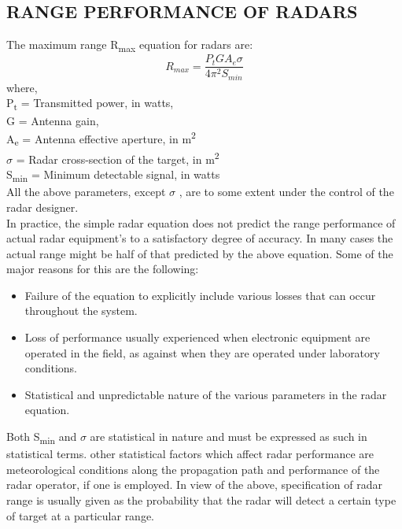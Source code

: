 \documentclass[12pt]{article} %
\begin{document}
\subsection{RANGE PERFORMANCE OF RADARS}
\noindent The maximum range R\textsubscript{max} equation for radars are:
\[R_{max} = \dfrac{P_tGA_e\sigma}{4\pi^{2}S_{min}} \]
where, \\ \indent P\textsubscript{t} = Transmitted power, in watts,
              \\ \indent G = Antenna gain,
              \\ \indent A\textsubscript{e} = Antenna effective aperture, in m\textsuperscript{2}
                         \\ \indent $\sigma$ =  Radar cross-section of the target, in m\textsuperscript{2}
              \\ \indent S\textsubscript{min} =  Minimum detectable signal, in watts\\
All the above parameters, except $\sigma$  , are to some extent under the control of the radar designer.
\\ In practice, the simple radar equation does not predict the range performance of actual radar equipment’s to a satisfactory degree of accuracy.
 In many cases the actual range might be half of that predicted by the above equation. Some of the major reasons for this are the following:
\begin{itemize} 
\item  Failure of the equation to explicitly include various losses that can occur throughout the system.
\item Loss of performance usually experienced when electronic equipment are operated in the field, as against when they are operated under laboratory conditions.
\item Statistical and unpredictable nature of the various parameters in the radar equation.
\end{itemize}
Both S\textsubscript{min} and $\sigma$ are statistical in nature and must be expressed as such in statistical terms. other statistical factors which affect radar performance are meteorological conditions along the propagation path and performance of the radar operator, if one is employed.
In view of the above, specification of radar range is usually given as the probability that the radar will detect a certain type of target at a particular range.
\end{document}
